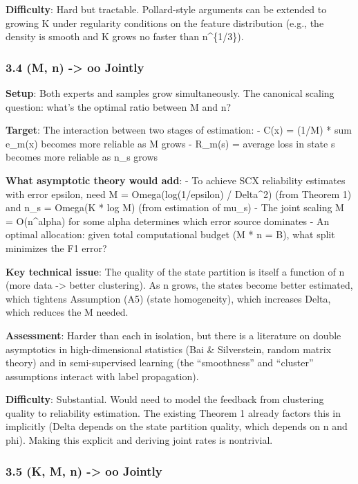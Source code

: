 \documentclass[
  12pt,
]{article}
\begin{document}
\textbf{Difficulty}: Hard but tractable. Pollard-style arguments can be
extended to growing K under regularity conditions on the feature
distribution (e.g., the density is smooth and K grows no faster than
n\^{}\{1/3\}).

\subsubsection{3.4 (M, n) -\textgreater{} oo
Jointly}\label{m-n---oo-jointly}

\textbf{Setup}: Both experts and samples grow simultaneously. The
canonical scaling question: what's the optimal ratio between M and n?

\textbf{Target}: The interaction between two stages of estimation: -
C(x) = (1/M) * sum e\_m(x) becomes more reliable as M grows - R\_m(s) =
average loss in state s becomes more reliable as n\_s grows

\textbf{What asymptotic theory would add}: - To achieve SCX reliability
estimates with error epsilon, need M = Omega(log(1/epsilon) /
Delta\^{}2) (from Theorem 1) and n\_s = Omega(K * log M) (from
estimation of mu\_s) - The joint scaling M = O(n\^{}alpha) for some
alpha determines which error source dominates - An optimal allocation:
given total computational budget (M * n = B), what split minimizes the
F1 error?

\textbf{Key technical issue}: The quality of the state partition is
itself a function of n (more data -\textgreater{} better clustering). As
n grows, the states become better estimated, which tightens Assumption
(A5) (state homogeneity), which increases Delta, which reduces the M
needed.

\textbf{Assessment}: Harder than each in isolation, but there is a
literature on double asymptotics in high-dimensional statistics (Bai \&
Silverstein, random matrix theory) and in semi-supervised learning (the
``smoothness'' and ``cluster'' assumptions interact with label
propagation).

\textbf{Difficulty}: Substantial. Would need to model the feedback from
clustering quality to reliability estimation. The existing Theorem 1
already factors this in implicitly (Delta depends on the state partition
quality, which depends on n and phi). Making this explicit and deriving
joint rates is nontrivial.

\subsubsection{3.5 (K, M, n) -\textgreater{} oo
Jointly}\label{k-m-n---oo-jointly}
\end{document}
